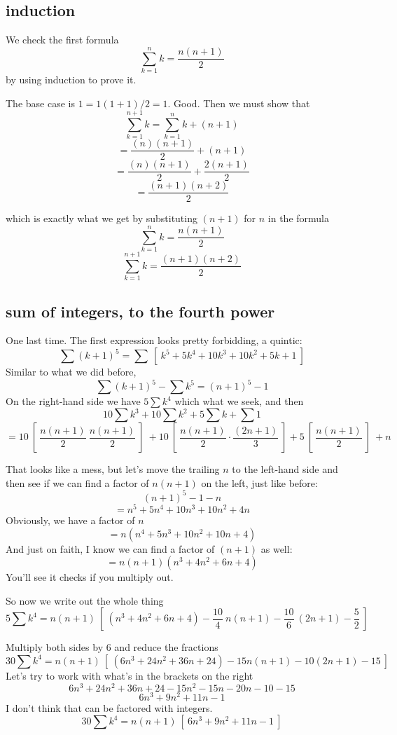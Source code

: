 \documentclass[11pt, oneside]{article}
\begin{document}
\subsection*{induction}
We check the first formula
\[ \sum_{k=1}^n k = \frac{n(n+1)}{2} \]
by using induction to prove it.
 
The base case is $1 = 1(1 + 1)/2 = 1$.  Good.  Then we must show that
\[ \sum_{k=1}^{n+1} k = \sum_{k=1}^{n} k + (n + 1) \]
\[ = \frac{(n)(n+1)}{2} + (n + 1) \]
\[ = \frac{(n)(n+1)}{2} + \frac{2(n + 1)}{2} \]
\[ = \frac{(n+1)(n+2)}{2}  \]

which is exactly what we get by substituting $(n+1)$ for $n$ in the formula
\[ \sum_{k=1}^n k = \frac{n(n+1)}{2} \]
\[ \sum_{k=1}^{n+1} k = \frac{(n+1)(n+2)}{2} \]

\subsection*{sum of integers, to the fourth power}

One last time.
The first expression looks pretty forbidding, a quintic:
\[ \sum (k + 1)^5 = \sum \ [ \ k^5 + 5k^4 + 10k^3 + 10k^2 + 5k + 1 \ ] \]
Similar to what we did before,
\[ \sum (k + 1)^5- \sum k^5 = (n+1)^5 - 1 \]
On the right-hand side we have $5 \sum k^4$ which what we seek, and then
\[ 10 \sum k^3 + 10 \sum k^2 + 5 \sum k + \sum 1 \]
\[ =  10 \ [ \ \frac{n(n+1)}{2} \ \frac{n(n+1)}{2} \ ] \ + 10 \ [ \ \frac{n(n+1)}{2} \cdot \frac{(2n+1)}{3}  \ ] + 5 \ [ \ \frac{n(n+1)}{2} \ ] \ + n \ \]

That looks like a mess, but let's move the trailing $n$ to the left-hand side and then see if we can find a factor of $n(n+1)$ on the left, just like before:
\[ (n+1)^5 - 1 - n \]
\[ = n^5 + 5n^4 + 10n^3 + 10n^2 + 4n \]
Obviously, we have a factor of $n$
\[ = n (n^4 + 5n^3 + 10n^2 + 10n + 4) \]
And just on faith, I know we can find a factor of $(n+1)$ as well:
\[ = n (n+1) (n^3 + 4n^2 + 6n + 4) \]
You'll see it checks if you multiply out.

So now we write out the whole thing 
\[ 5 \sum k^4 = n (n+1) \ [ \ (n^3 + 4n^2 + 6n + 4) - \frac{10}{4} \ n (n+1) - \frac{10}{6} \  (2n + 1) - \frac{5}{2}  \ ] \]

Multiply both sides by $6$ and reduce the fractions
\[  30 \sum k^4 = n (n+1) \ [ \ (6 n^3 + 24 n^2 + 36n + 24) - 15 n (n+1) - 10  (2n + 1) - 15  \ ] \]
Let's try to work with what's in the brackets on the right
\[  6n^3 + 24n^2 + 36n + 24 - 15 n^2 - 15n - 20n -10 - 15 \]
\[  6 n^3 + 9 n^2 + 11 n - 1  \]
I don't think that can be factored with integers.
\[  30 \sum k^4 = n (n+1) \ [ \ 6 n^3 + 9 n^2 + 11 n - 1 \ ]  \]
\end{document}
